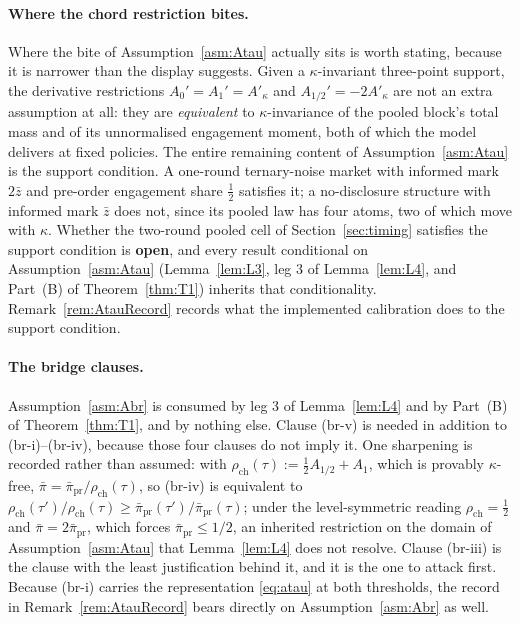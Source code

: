 \documentclass[11pt]{article}
\newcommand{\Akap}{A'_{\kappa}}
\begin{document}
\paragraph{Where the chord restriction bites.}
Where the bite of Assumption~\ref{asm:Atau} actually sits is worth stating, because it is narrower
than the display suggests. Given a $\kappa$-invariant three-point support, the derivative
restrictions $A_0' = A_1' = \Akap$ and $A_{1/2}' = -2\Akap$ are not an extra assumption at all: they
are \emph{equivalent} to $\kappa$-invariance of the pooled block's total mass and of its
unnormalised engagement moment, both of which the model delivers at fixed policies. The entire
remaining content of Assumption~\ref{asm:Atau} is the support condition. A one-round ternary-noise
market with informed mark $2\bar z$ and pre-order engagement share $\tfrac12$ satisfies it; a
no-disclosure structure with informed mark $\bar z$ does not, since its pooled law has four atoms,
two of which move with $\kappa$. Whether the two-round pooled cell of Section~\ref{sec:timing}
satisfies the support condition is \textbf{open}, and every result conditional on
Assumption~\ref{asm:Atau} (Lemma~\ref{lem:L3}, leg 3 of Lemma~\ref{lem:L4}, and Part~(B) of
Theorem~\ref{thm:T1}) inherits that conditionality. Remark~\ref{rem:AtauRecord} records what the implemented calibration does to the support condition.

\paragraph{The bridge clauses.}
Assumption~\ref{asm:Abr} is consumed by leg 3 of Lemma~\ref{lem:L4} and by Part~(B) of
Theorem~\ref{thm:T1}, and by nothing else. Clause (br-v) is needed in addition to (br-i)--(br-iv),
because those four clauses do not imply it. One
sharpening is recorded rather than assumed: with $\rho_{\mathrm{ch}}(\tau) := \tfrac12 A_{1/2} + A_1$, which is provably
$\kappa$-free, $\bar\pi = \bar\pi_{\mathrm{pr}}/\rho_{\mathrm{ch}}(\tau)$, so (br-iv) is equivalent to
$\rho_{\mathrm{ch}}(\tau')/\rho_{\mathrm{ch}}(\tau) \ge \bar\pi_{\mathrm{pr}}(\tau')/\bar\pi_{\mathrm{pr}}(\tau)$; under the
level-symmetric reading $\rho_{\mathrm{ch}} = \tfrac12$ and $\bar\pi = 2\bar\pi_{\mathrm{pr}}$, which forces
$\bar\pi_{\mathrm{pr}} \le 1/2$, an inherited restriction on the domain of
Assumption~\ref{asm:Atau} that Lemma~\ref{lem:L4} does not resolve. Clause (br-iii) is the clause
with the least justification behind it, and it is the one to attack first. Because (br-i) carries the
representation \eqref{eq:atau} at both thresholds, the record in Remark~\ref{rem:AtauRecord} bears
directly on Assumption~\ref{asm:Abr} as well.
\end{document}
